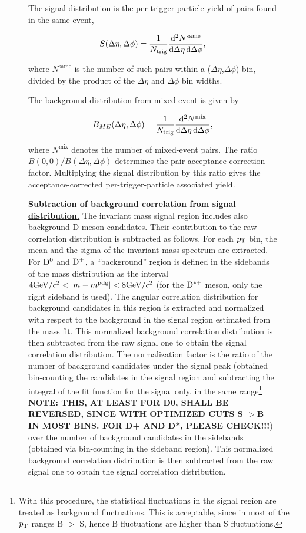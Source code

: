 \begin{enumerate}
\begin{figure}[h]
The signal distribution is the per-trigger-particle yield of pairs found in the same event,
\begin{linenomath}
\begin{equation}
\label{eq:signal}
S(\Delta\eta,\Delta\phi) = \frac{1}{N_\text{trig}}\frac{\mathrm{d}^{2}N^\text{same}}{\mathrm{d}\Delta\eta\, \mathrm{d}\Delta\phi},
\end{equation}
\end{linenomath}
where $N^\text{same}$ is the number of such pairs within a ($\Delta\eta$,$\Delta\phi$) bin, divided by the product of the $\Delta\eta$ and $\Delta\phi$ bin widths.

The background distribution from mixed-event is given by
\begin{linenomath}
\begin{equation}
\label{eq:background}
B_{ME}(\Delta\eta,\Delta\phi) = \frac{1}{N_\text{trig}}\frac{\mathrm{d}^{2}N^\text{mix}}{\mathrm{d}\Delta\eta\, \mathrm{d}\Delta\phi},
\end{equation}
\end{linenomath}
where $N^\text{mix}$ denotes the number of
mixed-event pairs.
The ratio $B(0,0)/B(\Delta\eta,\Delta\phi)$
determines the pair acceptance correction
factor. Multiplying the signal distribution by this ratio
gives the acceptance-corrected per-trigger-particle associated
yield.

\item
\underline {\bf Subtraction of background correlation from signal distribution.}
The invariant mass signal region includes also background D-meson candidates. Their contribution to the
raw correlation distribution is subtracted as follows. For each $p_{\rm T}$ bin, the mean and the sigma of the
invariant mass spectrum are extracted. For ${\rm D^0}$ and ${\rm D^+}$, a ``background'' region is defined in the sidebands of the mass
distribution as the interval $4 \gev/c^2<|m-m^{\rm pdg}|<8 \gev/c^2$ (for the ${\rm D^{*+}}$ meson, only the right sideband is used). The angular correlation distribution
for background candidates in this region is extracted and normalized with respect to the background in the signal region
estimated from the mass fit. This normalized background correlation distribution is then subtracted from the
raw signal one to obtain the signal correlation distribution. The normalization factor is the ratio of the number of background candidates under the signal peak (obtained bin-counting the candidates in the signal region and subtracting the integral of the fit function for the signal only, in the same range\footnote{With this procedure, the statistical fluctuations in the signal region are treated as background fluctuations. This is acceptable, since in most of the $p_{\rm T}$ ranges B $>$ S, hence B fluctuations are higher than S fluctuations.} {\bf NOTE: THIS, AT LEAST FOR D0, SHALL BE REVERSED, SINCE WITH OPTIMIZED CUTS S $>$B IN MOST BINS. FOR D+ AND D*, PLEASE CHECK!!!}) over the number of background candidates in the sidebands (obtained via bin-counting in the sideband region). This normalized background correlation distribution is then subtracted from the
raw signal one to obtain the signal correlation distribution.


\end{figure}
\end{enumerate}
